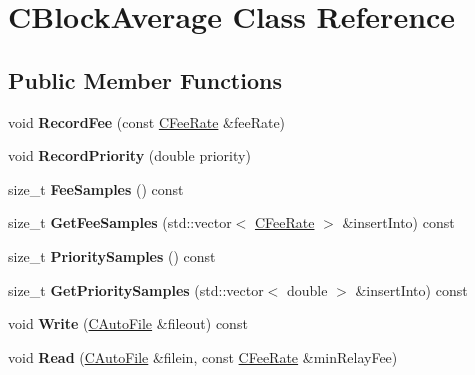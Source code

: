 \hypertarget{class_c_block_average}{}\section{C\+Block\+Average Class Reference}
\label{class_c_block_average}
\subsection*{Public Member Functions}
\begin{DoxyCompactItemize}
\item 
\mbox{\label{class_c_block_average_a50af3241dc8fb3e49e1e980ed2a7fc95}} 
void {\bfseries Record\+Fee} (const \mbox{\hyperlink{class_c_fee_rate}{C\+Fee\+Rate}} \&fee\+Rate)
\item 
\mbox{\label{class_c_block_average_ae4d71208ccf3ecd85751ce3644d12853}} 
void {\bfseries Record\+Priority} (double priority)
\item 
\mbox{\label{class_c_block_average_a38c311149c426f0abf07ff6ac52b033c}} 
size\+\_\+t {\bfseries Fee\+Samples} () const
\item 
\mbox{\label{class_c_block_average_a92007db34b4a44738a50d5d8c0cb5234}} 
size\+\_\+t {\bfseries Get\+Fee\+Samples} (std\+::vector$<$ \mbox{\hyperlink{class_c_fee_rate}{C\+Fee\+Rate}} $>$ \&insert\+Into) const
\item 
\mbox{\label{class_c_block_average_a50351224b6b0a54051d57d16072741e5}} 
size\+\_\+t {\bfseries Priority\+Samples} () const
\item 
\mbox{\label{class_c_block_average_a927ff52139522ee22069fadb959f353a}} 
size\+\_\+t {\bfseries Get\+Priority\+Samples} (std\+::vector$<$ double $>$ \&insert\+Into) const
\item 
\mbox{\label{class_c_block_average_a2bdaa124642e799a4ed5d6840f6e59a4}} 
void {\bfseries Write} (\mbox{\hyperlink{class_c_auto_file}{C\+Auto\+File}} \&fileout) const
\item 
\mbox{\label{class_c_block_average_aac4081eec4bf68d7d3a07521ea953489}} 
void {\bfseries Read} (\mbox{\hyperlink{class_c_auto_file}{C\+Auto\+File}} \&filein, const \mbox{\hyperlink{class_c_fee_rate}{C\+Fee\+Rate}} \&min\+Relay\+Fee)
\end{DoxyCompactItemize}
